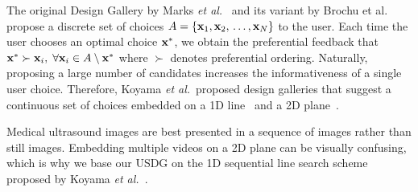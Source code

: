 The original Design Gallery by Marks \textit{et al.}~\cite{10.1145/258734.258887} and its variant by Brochu et al.~\cite{brochu_bayesian_2010} propose a discrete set of choices \(A = \{\mathbf{x}_1, \mathbf{x}_2,{\,\ldots\,}, \mathbf{x}_N\}\) to the user.
Each time the user chooses an optimal choice \(\mathbf{x}^*\), we obtain the preferential feedback that \(\mathbf{x}^* \succ \mathbf{x}_i,\; \forall\mathbf{x}_i \in A \setminus \mathbf{x}^* \) where \(\succ\) denotes preferential ordering.
Naturally, proposing a large number of candidates increases the informativeness of a single user choice.
Therefore, Koyama \textit{et al.}~proposed design galleries that suggest a continuous set of choices embedded on a 1D line~\cite{10.1145/3072959.3073598} and a 2D plane~\cite{koyama_sequential_2020}.

Medical ultrasound images are best presented in a sequence of images rather than still images.
Embedding multiple videos on a 2D plane can be visually confusing, which is why we base our USDG on the 1D sequential line search scheme proposed by Koyama \textit{et al.}~\cite{10.1145/3072959.3073598}.

